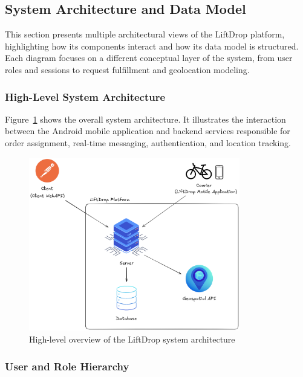 \subsection{System Architecture and Data Model}

This section presents multiple architectural views of the LiftDrop platform, highlighting how its components interact and how its data model is structured. Each diagram focuses on a different conceptual layer of the system, from user roles and sessions to request fulfillment and geolocation modeling.

\subsubsection{High-Level System Architecture}

Figure~\ref{fig:high-level-Overview} shows the overall system architecture. It illustrates the interaction between the Android mobile application and backend services responsible for order assignment, real-time messaging, authentication, and location tracking.

\vspace{5mm}

\begin{figure}[H]
    \centering
    \includegraphics[width=0.82\textwidth]{images/LiftDrop_High_level_view.png}
    \caption{High-level overview of the LiftDrop system architecture}
    \label{fig:high-level-Overview}
\end{figure}

\newpage

\subsubsection{User and Role Hierarchy}

